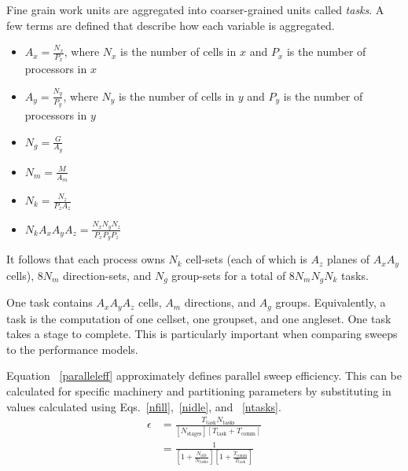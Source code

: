 \documentclass[11pt, letterpaper,titlepage,oneside]{article}
\begin{document}
Fine grain work units are aggregated into coarser-grained units called \textit{tasks}. A few terms are defined that describe how each variable is aggregated.
\begin{itemize}
\item $A_x = \frac{N_x}{P_x}$, where $N_x$ is the number of cells in $x$ and $P_x$ is the number of processors in $x$
\item $A_y = \frac{N_y}{P_y}$, where $N_y$ is the number of cells in $y$ and $P_y$ is the number of processors in $y$
\item $N_g = \frac{G}{A_g}$
\item $N_m = \frac{M}{A_m}$
\item $N_k = \frac{N_z}{P_z A_z}$
\item $N_k A_x A_y A_z = \frac{N_x N_y N_z}{P_x P_y P_z}$
\end{itemize}

It follows that each process owns $N_k$ cell-sets (each of which is $A_z$ planes of $A_x A_y$ cells), $8N_m$ direction-sets, and $N_g$ group-sets for a total of $8N_m N_g N_k$ tasks.

One task contains $A_x A_y A_z$ cells, $A_m$ directions, and $A_g$ groups. Equivalently, a task is the computation of one cellset, one groupset, and one angleset. One task takes a stage to complete.  This is particularly important when comparing sweeps to the performance models. 

Equation ~\eqref{paralleleff} approximately defines parallel sweep efficiency. This can be calculated for specific machinery and partitioning parameters by substituting in values calculated using Eqs.~\eqref{nfill},~\eqref{nidle}, and ~\eqref{ntasks}.
\begin{equation}\label{paralleleff}
\begin{split}
\epsilon &= \frac{T_{\text{task}} N_{\text{tasks}}}{[N_{\text{stages}}] [T_{\text{task}} + T_{\text{comm}}]} \\
            &=\frac{1}{[1+\frac{N_{\text{idle}}}{N_{\text{tasks}}}][1 + \frac{T_{\text{comm}}}{T_{\text{task}}}]}
\end{split}
\end{equation}
\end{document}

